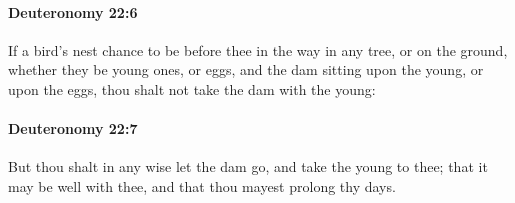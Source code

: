 		\paragraph{Deuteronomy 22:6} %
			\label{DEUTERONOMY-22-6}

			If a bird's nest chance to be before thee in the way in any tree, or on the ground, whether they be young ones, or eggs, and the dam sitting upon the young, or upon the eggs, thou shalt not take the dam with the young:


		\paragraph{Deuteronomy 22:7} %
			\label{DEUTERONOMY-22-7}

			But thou shalt in any wise let the dam go, and take the young to thee; that it may be well with thee, and that thou mayest prolong thy days.

